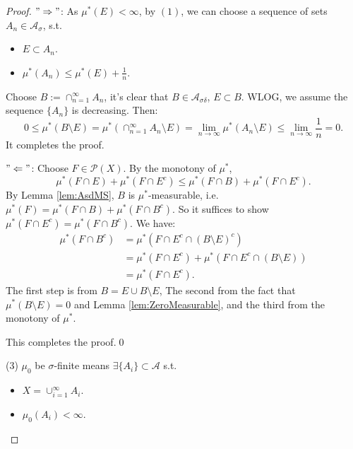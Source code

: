 \documentclass{article}
\newcommand{\cp}[1]{\cup_{#1=1}^{\infty}}
\begin{document}
\begin{proof}
    $"\Rightarrow"$: 
    As $\mu^{*}(E)<\infty$, 
    by $(1)$, we can choose a sequence of sets 
    $A_{n}\in\mathcal{A}_{\sigma}$, s.t. 
    \begin{itemize}
        \item $E\subset A_{n}$.
        \item $\mu^*(A_{n})\le\mu^{*}(E)+\frac{1}{n}$.
    \end{itemize}
    Choose $B:=\cap_{n=1}^{\infty}A_{n}$, 
    it's clear that $B\in\mathcal{A}_{\sigma\delta}$, $E\subset B$. 
    WLOG, we assume the sequence $\{A_{n}\}$ is decreasing. 
    Then:
    \begin{displaymath}
        0\le\mu^{*}(B\setminus E)=\mu^{*}
        (\cap_{n=1}^{\infty}A_{n}\setminus E)
        =\lim_{n\rightarrow\infty}\mu^{*}(A_{n}\setminus E)
        \le\lim_{n\rightarrow\infty}\frac{1}{n}
        =0.
    \end{displaymath}
    It completes the proof.

    $"\Leftarrow"$: Choose $F\in\mathcal{P}(X)$. 
    By the monotony of $\mu^{*}$, 
    \begin{displaymath}
        \mu^{*}(F\cap E)+\mu^{*}(F\cap E^{c})\le \mu^{*}(F\cap B)
        +\mu^{*}(F\cap E^c).
    \end{displaymath}
    By Lemma \ref{lem:AsdMS}, $B$ is $\mu^*$-measurable, i.e. 
    $\mu^{*}(F)=\mu^{*}(F\cap B)+\mu^{*}(F\cap B^{c})$. 
    So it suffices to show 
    $\mu^{*}(F\cap E^{c})=\mu^{*}(F\cap B^{c})$. 
    We have:
    \begin{displaymath}
        \begin{aligned}
        \mu^{*}(F\cap B^c)&=\mu^{*}(F\cap E^{c}\cap(B\setminus E)^{c})\\
        &=\mu^{*}(F\cap E^{c})+\mu^{*}(F\cap E^{c}\cap(B\setminus E))\\
        &=\mu^{*}(F\cap E^{c}).
        \end{aligned}
    \end{displaymath}
    The first step is from $B=E\cup B\setminus E$, 
    The second from the fact that $\mu^{*}(B\setminus E)=0$ 
    and Lemma \ref{lem:ZeroMeasurable}, 
    and the third from the monotony of $\mu^{*}$.

    This completes the proof.\qed
    
    (3) $\mu_{0}$ be $\sigma$-finite means 
    $\exists\{A_{i}\}\subset\mathcal{A}$ s.t. 
    \begin{itemize}
        \item $X=\cp{i}A_{i}$.
        \item $\mu_{0}(A_{i})<\infty$.
    \end{itemize}


\end{proof}
\end{document}
